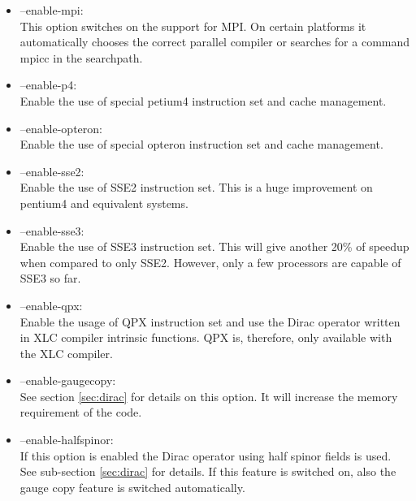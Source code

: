 \begin{itemize}
\item {\ttfamily --enable-mpi}:\\
  This option switches on the support for MPI. On certain platforms it
  automatically chooses the correct parallel compiler or searches for
  a command {\ttfamily mpicc} in the searchpath.

\item {\ttfamily --enable-p4}:\\
  Enable the use of special petium4 instruction set and cache
  management.

\item {\ttfamily --enable-opteron}:\\
  Enable the use of special opteron instruction set and cache
  management.


\item {\ttfamily --enable-sse2}:\\
  Enable the use of SSE2 instruction set. This is a huge improvement
  on pentium4 and equivalent systems.

\item {\ttfamily --enable-sse3}:\\
  Enable the use of SSE3 instruction set. This will give another 20\%
  of speedup when compared to only SSE2. However, only a few
  processors are capable of SSE3 so far.

\item {\ttfamily --enable-qpx}:\\
  Enable the usage of QPX instruction set and use the Dirac operator
  written in XLC compiler intrinsic functions. QPX is, therefore, only
  available with the XLC compiler.

\item {\ttfamily --enable-gaugecopy}:\\
  See section \ref{sec:dirac} for details on this option. It will
  increase the memory requirement of the code.

\item {\ttfamily --enable-halfspinor}:\\
  If this option is enabled the Dirac operator using half spinor
  fields is used. See sub-section \ref{sec:dirac} for details. If this
  feature is switched on, also the gauge copy feature is switched
  automatically. 


\end{itemize}
